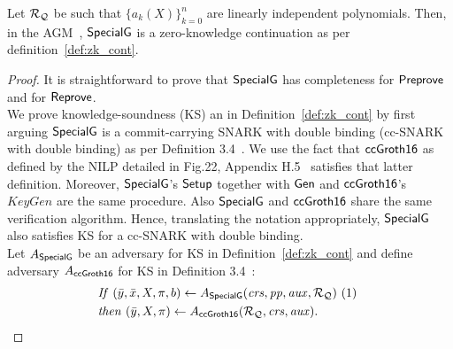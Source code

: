 \begin{theorem}
\label{sec_specialg}
Let $\mathcal{R}_{\mathcal{Q}}$ be such that $\{a_k(X)\}_{k=0}^n$ are linearly independent polynomials. Then, in the 
AGM~\cite{Fuchs_AGM}, ${\mathsf{SpecialG}}$ is a zero-knowledge continuation as per definition~\ref{def:zk_cont}. 
\end{theorem}
\begin{proof} It is straightforward to prove that ${\mathsf{SpecialG}}$ has completeness for ${\mathsf{Preprove}}$ and for ${\mathsf{Reprove}}$. \\

\noindent We prove knowledge-soundness (KS) an in Definition~\ref{def:zk_cont} by first arguing ${\mathsf{SpecialG}}$ is a 
commit-carrying SNARK with double binding (cc-SNARK with double binding) as per Definition 3.4~\cite{LegoSNARK}. 
We use the fact that ${\mathsf{ccGroth16}}$ as defined by the NILP detailed in Fig.22, Appendix H.5~\cite{LegoSNARK} satisfies that latter definition. Moreover, 
${\mathsf{SpecialG}}$'s ${\mathsf{Setup}}$ together with $\mathsf{Gen}$ and ${\mathsf{ccGroth16}}$'s $\mathit{KeyGen}$ are the same procedure. Also ${\mathsf{SpecialG}}$ 
and ${\mathsf{ccGroth16}}$ share the same verification algorithm. Hence, translating the notation appropriately, ${\mathsf{SpecialG}}$ also satisfies KS 
for a cc-SNARK with double binding. \\

\noindent Let $A_{{\mathsf{SpecialG}}}$ be an adversary for KS in Definition~\ref{def:zk_cont} and 
define adversary $A_{{\mathsf{ccGroth16}}}$ for KS  in Definition 3.4~\cite{LegoSNARK}:
\begin{align*}
&\mathit{If} \ (\bar{y}, \bar{x}, X, \pi, b) \leftarrow A_{{\mathsf{SpecialG}}} (\mathit{crs}, \mathit{pp}, \mathit{aux}, \mathcal{R}_{\mathcal{Q}})\  (1)\ \\ 
&\mathit{then} \ (\bar{y}, X, \pi) \leftarrow A_{{\mathsf{ccGroth16}}} (\mathcal{R}_{\mathcal{Q}}, \mathit{crs}, \mathit{aux}).
\end{align*}


\end{proof}
